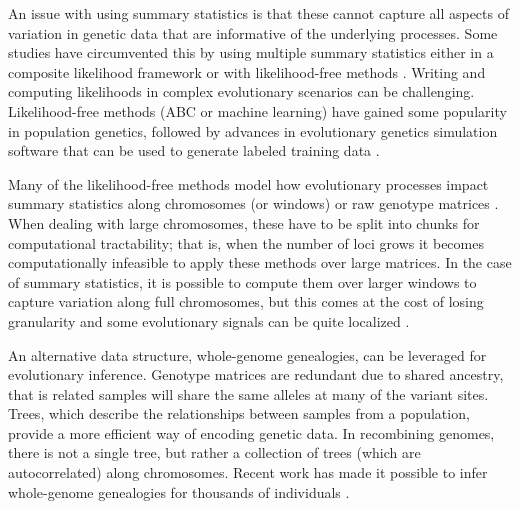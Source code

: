 An issue with using summary statistics is that these cannot capture all aspects of variation in genetic data that are informative of the underlying processes.
Some studies have circumvented this by using multiple summary statistics either in a composite likelihood framework or with likelihood-free methods \citep{nielsen_genomic_2005, degiorgio_sweepfinder2_2016, sheehan_deep_2016, caldas_inference_2022, pavlidis_sweed_2013}.
Writing and computing likelihoods in complex evolutionary scenarios can be challenging.
Likelihood-free methods (\eg ABC or machine learning) have gained some popularity in population genetics,
followed by advances in evolutionary genetics simulation software that can be used to generate labeled training data \citep{haller_tree-sequence_2019, kelleher_efficient_2016, ralph_efficiently_2020}.

Many of the likelihood-free methods model how evolutionary processes impact summary statistics along chromosomes (or windows) or raw genotype matrices \citep{schrider_shic_2016, flagel_unreasonable_2019, sheehan_deep_2016}.
When dealing with large chromosomes, these have to be split into chunks for computational tractability;
that is, when the number of loci grows it becomes computationally infeasible to apply these methods over large matrices.
In the case of summary statistics, it is possible to compute them over larger windows to capture variation along full chromosomes,
but this comes at the cost of losing granularity and some evolutionary signals can be quite localized \citep{caldas_inference_2022}.

An alternative data structure, whole-genome genealogies, can be leveraged for evolutionary inference.
Genotype matrices are redundant due to shared ancestry, that is related samples will share the same alleles at many of the variant sites.
Trees, which describe the relationships between samples from a population, provide a more efficient way of encoding genetic data.
In recombining genomes, there is not a single tree, but rather a collection of trees (which are autocorrelated) along chromosomes.
Recent work has made it possible to infer whole-genome genealogies for thousands of individuals \citep{speidel_inferring_2021, kelleher_inferring_2019, zhang_biobank-scale_2023}.

